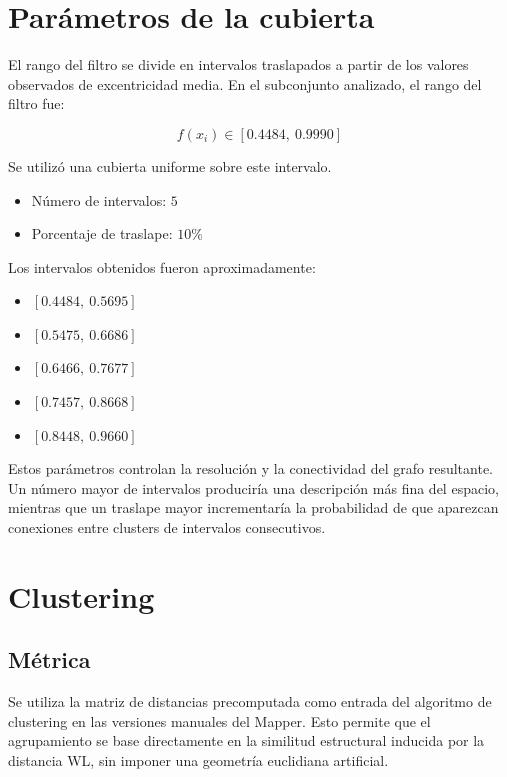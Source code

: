 \documentclass[12pt]{article}
\begin{document}
\section{Par\'ametros de la cubierta}

El rango del filtro se divide en intervalos traslapados a partir de los valores observados de excentricidad media. En el subconjunto analizado, el rango del filtro fue:

\[
f(x_i) \in [0.4484,\ 0.9990]
\]

Se utiliz\'o una cubierta uniforme sobre este intervalo.

\begin{itemize}
    \item N\'umero de intervalos: $5$
    \item Porcentaje de traslape: $10\%$
\end{itemize}

Los intervalos obtenidos fueron aproximadamente:

\begin{itemize}
    \item $[0.4484,\ 0.5695]$
    \item $[0.5475,\ 0.6686]$
    \item $[0.6466,\ 0.7677]$
    \item $[0.7457,\ 0.8668]$
    \item $[0.8448,\ 0.9660]$
\end{itemize}

Estos par\'ametros controlan la resoluci\'on y la conectividad del grafo resultante. Un n\'umero mayor de intervalos producir\'ia una descripci\'on m\'as fina del espacio, mientras que un traslape mayor incrementar\'ia la probabilidad de que aparezcan conexiones entre clusters de intervalos consecutivos.


\section{Clustering}

\subsection{M\'etrica}

Se utiliza la matriz de distancias precomputada como entrada del algoritmo de clustering en las versiones manuales del Mapper. Esto permite que el agrupamiento se base directamente en la similitud estructural inducida por la distancia WL, sin imponer una geometr\'ia euclidiana artificial.
\end{document}
